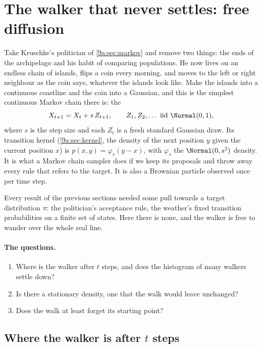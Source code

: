 \section{The walker that never settles: free diffusion}
\label{9a:sec:diffusion}

Take Kruschke's politician of \cref{9a:sec:markov} and remove two things: the ends of the
archipelago and his habit of comparing populations. He now lives on an endless chain of
islands, flips a coin every morning, and moves to the left or right neighbour as the coin says,
whatever the islands look like. Make the islands into a continuous coastline and the coin into
a Gaussian, and this is the simplest continuous Markov chain there is: the 
\begin{equation}
  X_{t+1}=X_t+s\,Z_{t+1},\qquad Z_1,Z_2,\dots\ \text{iid}\ \Normal(0,1),
  \label{9a:eq:free-walk}
\end{equation}
where $s$ is the step size and each $Z_t$ is a fresh standard Gaussian draw. Its transition kernel
(\cref{9a:sec:kernel}, the density of the next position $y$ given the current position $x$) is
$p(x,y)=\varphi_s(y-x)$, with $\varphi_s$ the $\Normal(0,s^2)$ density. It is what a Markov chain
sampler does if we keep its proposals and throw away every rule that refers to the target. It is
also a Brownian particle observed once per time step.

Every result of the previous sections needed some pull towards a target distribution $\pi$:
the politician's acceptance rule, the weather's fixed transition probabilities on a finite set
of states. Here there is none, and the walker is free to wander over the whole real line.

\paragraph{The questions.}
\begin{enumerate}[itemsep=1pt]
  \item Where is the walker after $t$ steps, and does the histogram of many walkers settle down?
  \item Is there a stationary density, one that the walk would leave unchanged?
  \item Does the walk at least forget its starting point?
\end{enumerate}

\subsection{Where the walker is after $t$ steps}
\label{9a:sec:free-spread}

